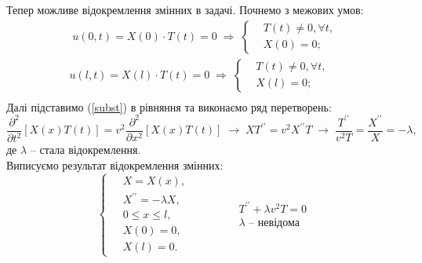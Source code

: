 \documentclass[a4paper, 14pt]{extreport}
\begin{document}
Тепер можливе відокремлення змінних в задачі. Почнемо з межових умов:
\begin{equation*}
    \begin{aligned}
        \;u(0,t) = X(0) \cdot T(t) = 0
        \;\Rightarrow\;
        \left\{ \begin{aligned}
            &T(t) \neq 0, \forall t, \\  &X(0) = 0; 
        \end{aligned} \right.\\
        u(l,t) = X(l) \cdot T(t) = 0
        \;\Rightarrow\;
        \left\{ \begin{aligned}
            &T(t) \neq 0, \forall t, \\  &X(l) = 0; 
        \end{aligned} \right.\\
    \end{aligned}
\end{equation*}
Далі підставимо (\ref{subst}) в рівняння та виконаємо ряд перетворень:
\begin{equation*}
    \frac{\partial^2}{\partial t^2}\left[X(x)T(t)\right] = v^2 \frac{\partial^2}{\partial x^2}\left[X(x)T(t)\right]
    \;\to\; 
    X T^{\prime\prime} = v^2 X^{\prime\prime} T 
    \;\to\; 
    \frac{T^{\prime\prime}}{v^2T} = \frac{X^{\prime\prime}}{X} = - \lambda,
\end{equation*}
де $\lambda$ -- стала відокремлення.\\
Виписуємо результат відокремлення змінних:
\begin{equation} \label{sepvar}
    \left\{ \begin{aligned}
        \;&X = X(x), \\  &X^{\prime\prime} = -\lambda X, \\ &0 \leq x \leq l, \\  &X(0) = 0, \\ &X(l) = 0. 
    \end{aligned} \right.
    \qquad\qquad
    \begin{aligned}
        T^{\prime\prime} + \lambda v^2 T = 0\\
        \lambda \text{ -- невідома}
    \end{aligned}
\end{equation}
\end{document}
